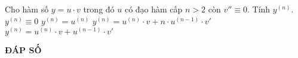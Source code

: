 \begin{ex}%
	Cho hàm số $y=u \cdot v$ trong đó $u$ có đạo hàm cấp $n>2$ còn $v''\equiv 0$. Tính  $y^{(n)}$.
	\choice
	{$y^{(n)}\equiv 0$}
	{$y^{(n)}=u^{(n)}$}
	{ \True $y^{(n)}=u^{(n)} \cdot v+n \cdot u^{(n-1)} \cdot v'$}
	{$y^{(n)}=u^{(n)} \cdot v+u^{(n-1)} \cdot v'$}
\end{ex}

\newpage 
\begin{center}
	\textbf{ĐÁP SỐ}
\end{center}
\begin{multicols}{10}
	\setlength{\columnseprule}{0pt}
	 
\end{multicols}
